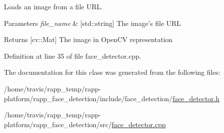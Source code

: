 Loads an image from a file U\-R\-L. 


\begin{DoxyParams}{Parameters}
{\em file\-\_\-name} & \mbox{[}std\-::string\mbox{]} The image's file U\-R\-L \\
\hline
\end{DoxyParams}
\begin{DoxyReturn}{Returns}
\mbox{[}cv\-::\-Mat\mbox{]} The image in Open\-C\-V representation 
\end{DoxyReturn}


Definition at line 35 of file face\-\_\-detector.\-cpp.



The documentation for this class was generated from the following files\-:\begin{DoxyCompactItemize}
\item 
/home/travis/rapp\-\_\-temp/rapp-\/platform/rapp\-\_\-face\-\_\-detection/include/face\-\_\-detection/\hyperlink{face__detector_8h}{face\-\_\-detector.\-h}\item 
/home/travis/rapp\-\_\-temp/rapp-\/platform/rapp\-\_\-face\-\_\-detection/src/\hyperlink{face__detector_8cpp}{face\-\_\-detector.\-cpp}\end{DoxyCompactItemize}
